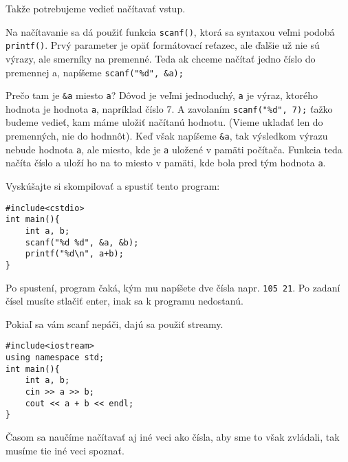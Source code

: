 Takže potrebujeme vedieť načítavať vstup.

Na načítavanie sa dá použiť funkcia \verb!scanf()!, ktorá sa syntaxou veľmi podobá \verb!printf()!. Prvý parameter je opäť 
formátovací reťazec, ale ďalšie už nie sú výrazy, ale smerníky na premenné. Teda ak chceme načítať jedno číslo do premennej
a, napíšeme \verb!scanf("%d", &a);!

Prečo tam je \verb!&a! miesto \verb!a!? Dôvod je veľmi jednoduchý, \verb!a! je výraz, ktorého hodnota je hodnota \verb!a!, napríklad číslo 7.
A zavolaním \verb!scanf("%d", 7);! ťažko budeme vedieť, kam máme uložiť načítanú hodnotu. (Vieme ukladať len do premenných, 
nie do hodnnôt). Keď však napíšeme \verb!&a!, tak výsledkom výrazu nebude hodnota \verb!a!, ale miesto, kde je \verb!a! uložené v pamäti počítača.
Funkcia teda načíta číslo a uloží ho na to miesto v pamäti, kde bola pred tým hodnota \verb!a!.

Vyskúšajte si skompilovať a spustiť tento program:
\begin{lstlisting}
#include<cstdio>
int main(){
    int a, b;
    scanf("%d %d", &a, &b);
    printf("%d\n", a+b);
}
\end{lstlisting}

Po spustení, program čaká, kým mu napíšete dve čísla napr. \verb"105 21". Po zadaní čísel musíte stlačiť enter,
inak sa k programu nedostanú. 

Pokiaľ sa vám scanf nepáči, dajú sa použiť streamy.
\begin{lstlisting}
#include<iostream>
using namespace std;
int main(){
    int a, b;
    cin >> a >> b;
    cout << a + b << endl;
}
\end{lstlisting}

Časom sa naučíme načítavať aj iné veci ako čísla, aby sme to však zvládali, tak musíme tie iné veci spoznať.
















